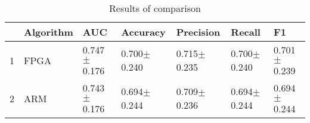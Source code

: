 \begin{table}
\footnotesize
\caption{Results of comparison}
\label{tab:comparison}
\begin{tabular}{lllllll}
\hline
 & Algorithm & AUC & Accuracy & Precision & Recall & F1 \\
\hline
1 & FPGA & 0.747$\pm$0.176 & 0.700$\pm$0.240 & 0.715$\pm$0.235 & 0.700$\pm$0.240 & 0.701$\pm$0.239 \\
2 & ARM & 0.743$\pm$0.176 & 0.694$\pm$0.244 & 0.709$\pm$0.236 & 0.694$\pm$0.244 & 0.694$\pm$0.244 \\
\hline
\end{tabular}
\end{table}
